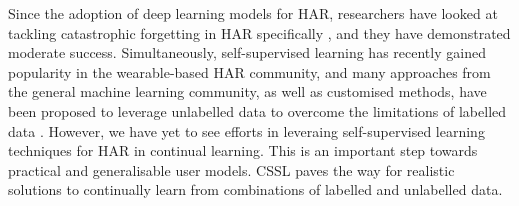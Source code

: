 Since the adoption of deep learning models for HAR, researchers have looked at tackling catastrophic forgetting in HAR specifically \cite{jha2021continual, leite2022resource, schiemer2023online}, and they have demonstrated moderate success. Simultaneously, self-supervised learning has recently gained popularity in the wearable-based HAR community, and many approaches from the general machine learning community, as well as customised methods, have been proposed to leverage unlabelled data to overcome the limitations of labelled data \cite{multi_self_har, tang2020exploring, haresamudram2020masked, tang2021selfhar, haresamudram2021contrastive}. However, we have yet to see efforts in leveraing self-supervised learning techniques for HAR in continual learning. This is an important step towards practical and generalisable user models. CSSL paves the way for realistic solutions to continually learn from combinations of labelled and unlabelled data.
